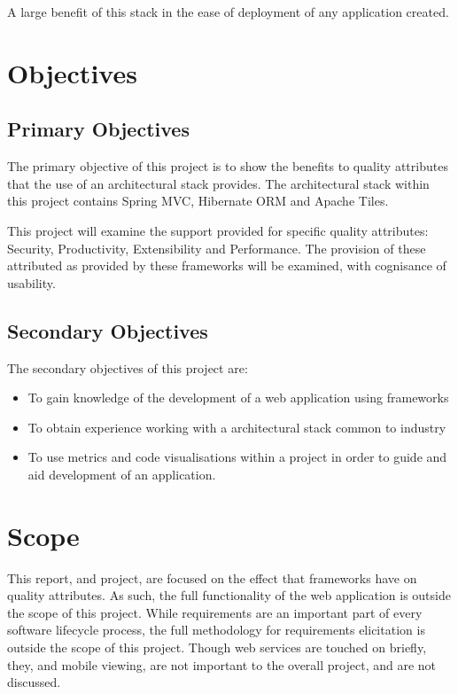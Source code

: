 A large benefit of this stack in the ease of deployment of any application created. 

\section{Objectives}

\subsection{Primary Objectives}

The primary objective of this project is to show the benefits to quality attributes that the use of an architectural stack provides. The architectural stack within this project contains Spring MVC, Hibernate ORM and Apache Tiles. 

This project will examine the support provided for specific quality attributes: Security, Productivity, Extensibility and Performance. The provision of these attributed as provided by these frameworks will be examined, with cognisance of usability. 

\subsection{Secondary Objectives}

The secondary objectives of this project are: 

\begin{itemize}
\item To gain knowledge of the development of a web application using frameworks
\item To obtain experience working with a architectural stack common to industry
\item To use metrics and code visualisations within a project in order to guide and aid development of an application.
\end{itemize}

\section{Scope}

This report, and project, are focused on the effect that frameworks have on quality attributes. As such, the full functionality of the web application is outside the scope of this project. While requirements are an important part of every software lifecycle process, the full methodology for requirements elicitation is outside the scope of this project. Though web services are touched on briefly, they, and mobile viewing, are not important to the overall project, and are not discussed. 

